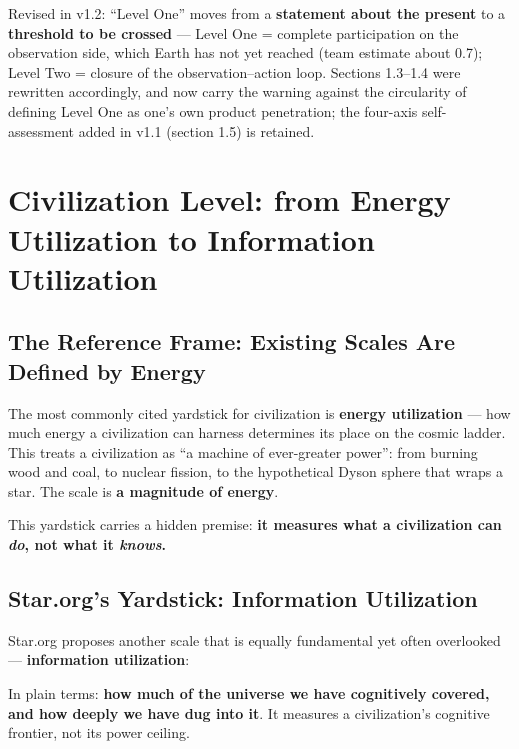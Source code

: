 \documentclass[11pt,fontset=none]{ctexart}
\begin{document}
{\small\color{inkfaint}Revised in v1.2: ``Level One'' moves from a \textbf{statement about the present} to a \textbf{threshold to be crossed} --- Level One = complete participation on the observation side, which Earth has not yet reached (team estimate about 0.7); Level Two = closure of the observation--action loop. Sections 1.3--1.4 were rewritten accordingly, and now carry the warning against the circularity of defining Level One as one's own product penetration; the four-axis self-assessment added in v1.1 (section 1.5) is retained.\par}

\newpage

\section{Civilization Level: from Energy Utilization to Information Utilization}

\subsection{The Reference Frame: Existing Scales Are Defined by Energy}

The most commonly cited yardstick for civilization is \textbf{energy utilization} — how much energy a civilization can harness determines its place on the cosmic ladder. This treats a civilization as ``a machine of ever-greater power'': from burning wood and coal, to nuclear fission, to the hypothetical Dyson sphere that wraps a star. The scale is \textbf{a magnitude of energy}.

This yardstick carries a hidden premise: \textbf{it measures what a civilization can \emph{do}, not what it \emph{knows}.}

\subsection{Star.org's Yardstick: Information Utilization}

Star.org proposes another scale that is equally fundamental yet often overlooked — \textbf{information utilization}:


In plain terms: \textbf{how much of the universe we have cognitively covered, and how deeply we have dug into it}. It measures a civilization's cognitive frontier, not its power ceiling.
\end{document}

